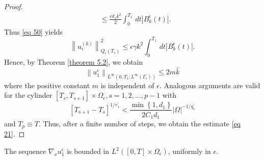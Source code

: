 \begin{proof}
\begin{equation}
\begin{aligned}
& \leq \frac{\epsilon d_{1} k^{2}}{2} \int_{0}^{T_{1}} \, d  t\left|B_{k}^{\epsilon}(t)\right| .
\end{aligned}
\label{eq 54}\end{equation}
Thus \eqref{eq 50} yields
\begin{equation}
  \left\|u_{\epsilon}^{(k)}\right\|_{Q_{\epsilon}\left(T_{1}\right)}^{2} \leq \epsilon \gamma k^{2} \int_{0}^{T_{1}} \, d  t\left|B_{k}^{\epsilon}(t)\right| .
\label{eq 55}\end{equation}
Hence, by Theorem \eqref{theorem 5.2}, we obtain
$$
\left\|u_{1}^{\epsilon}\right\|_{L^{\infty}\left(0, T_{1} ; L^{\infty}\left(\Gamma_{\epsilon}\right)\right)} \leq 2 m \hat{k}
$$
where the positive constant $m$ is independent of $\epsilon$. Analogous arguments are valid for the cylinder $\left[T_{s}, T_{s+1}\right] \times \Omega_{\epsilon}, s=1,2, \ldots, p-1$ with
$$
\left[T_{s+1}-T_{s}\right]^{1 / r_{1}^{\prime}}<\frac{\min \left\{1, d_{1}\right\}}{2 C_{1} d_{1}}|\Omega|^{-1 / q_{1}^{\prime}}
$$
and $T_{p} \equiv T$. Thus, after a finite number of steps, we obtain the estimate \eqref{eq 21}.
\end{proof}
\begin{lemma}
  The sequence $\nabla_{x} u_{1}^{\epsilon}$ is bounded in $L^{2}\left([0, T] \times \Omega_{\epsilon}\right)$, uniformly in $\epsilon$.
\label{lemma 5.4}\end{lemma}
